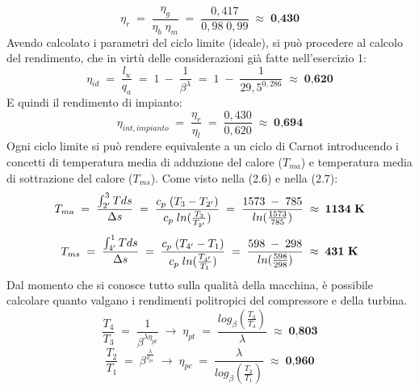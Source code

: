 \documentclass[a4paper, twoside, 12pt]{report}
\begin{document}
\begin{equation}
	\eta_{r}\;=\;\dfrac{\eta_{g}}{\eta_{b}\;\eta_{m}}\;=\;\dfrac{0,417}{0,98\;0,99}\;\approx\;\textbf{0,430}
\end{equation}
Avendo calcolato i parametri del ciclo limite (ideale), si può procedere al calcolo del rendimento, che in virtù delle considerazioni già fatte nell'esercizio 1:
\begin{equation}
	\eta_{id}\;=\;\dfrac{l_{u}}{q_{a}}\;=\;1\:-\;\dfrac{1}{\beta^{\lambda}}\;=\;1\;-\;\dfrac{1}{29,5^{0,286}}\;\approx\;\textbf{0,620}
\end{equation}
E quindi il rendimento di impianto:
\begin{equation}
	\eta_{int,impianto}\;=\;\dfrac{\eta_{r}}{\eta_{l}}\;=\;\dfrac{0,430}{0,620}\;\approx\;\textbf{0,694}
\end{equation}
Ogni ciclo limite si può rendere equivalente a un ciclo di Carnot introducendo i concetti di temperatura media di adduzione del calore ($T_{ma}$) e temperatura media di sottrazione del calore ($T_{ms}$). Come visto nella (2.6) e nella (2.7):
\begin{equation}
	T_{ma}\;=\;\dfrac{\int_{2'}^{3}Tds}{\Delta s}\;=\;\dfrac{c_{p}\;(T_{3}-T_{2'})}{c_{p}\;ln(\frac{T_{3}}{T_{2'}})}\;=\;\dfrac{1573\;-\;785}{ln(\frac{1573}{785})}\;\approx\;\textbf{1134\;K}
\end{equation}
\begin{equation}
	T_{ms}\;=\;\dfrac{\int_{4'}^{1}Tds}{\Delta s}\;=\;\dfrac{c_{p}\;(T_{4'}-T_{1})}{c_{p}\;ln(\frac{T_{4'}}{T_{1}})}\;=\;\dfrac{598\;-\;298}{ln(\frac{598}{298})}\;\approx\;\textbf{431\;K}
\end{equation}
Dal momento che si conosce tutto sulla qualità della macchina, è possibile calcolare quanto valgano i rendimenti politropici del compressore e della turbina.\\
\begin{equation}
	\dfrac{T_{4}}{T_{3}}\;=\;\dfrac{1}{\beta^{\lambda\eta_{pt}}}\;\to\;\eta_{pt}\;=\;\dfrac{log_{\beta}(\frac{T_{3}}{T_{4}})}{\lambda}\;\approx\;\textbf{0,803}
\end{equation}
\begin{equation}
	\dfrac{T_{2}}{T_{1}}\;=\;\beta^{\frac{\lambda}{\eta_{pc}}}\;\to\;\eta_{pc}\;=\;\dfrac{\lambda}{log_{\beta}(\frac{T_{2}}{T_{1}})}\;\approx\;\textbf{0,960}
\end{equation}
\newpage
\end{document}
